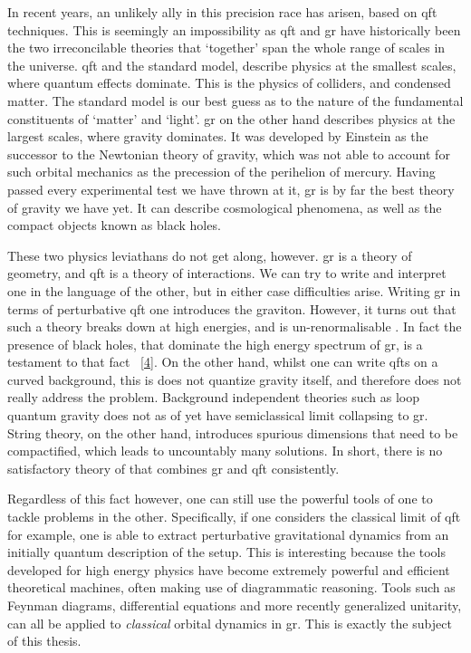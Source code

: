 \documentclass[
  10pt,
  a4paper,
  DIV=11,
  numbers=noendperiod,
  twoside]{scrreprt}
\DeclareRobustCommand{\[}{\begin{equation}}
\DeclareRobustCommand{\]}{\end{equation}}
\begin{document}
In recent years, an unlikely ally in this precision race has arisen,
based on \gls{qft} techniques. This is seemingly an impossibility as
\gls{qft} and \gls{gr} have historically been the two irreconcilable
theories that `together' span the whole range of scales in the universe.
\gls{qft} and the standard model, describe physics at the smallest
scales, where quantum effects dominate. This is the physics of
colliders, and condensed matter. The standard model is our best guess as
to the nature of the fundamental constituents of `matter' and `light'.
\gls{gr} on the other hand describes physics at the largest scales,
where gravity dominates. It was developed by Einstein as the successor
to the Newtonian theory of gravity, which was not able to account for
such orbital mechanics as the precession of the perihelion of mercury.
Having passed every experimental test we have thrown at it, \gls{gr} is
by far the best theory of gravity we have yet. It can describe
cosmological phenomena, as well as the compact objects known as black
holes.

These two physics leviathans do not get along, however. \gls{gr} is a
theory of geometry, and \gls{qft} is a theory of interactions. We can
try to write and interpret one in the language of the other, but in
either case difficulties arise. Writing \gls{gr} in terms of
perturbative \gls{qft} one introduces the graviton. However, it turns
out that such a theory breaks down at high energies, and is
un-renormalisable . In fact the presence of black holes, that dominate
the high energy spectrum of \gls{gr}, is a testament to that fact
~{[}\protect\hyperlink{ref-Shomer:2007vq}{4}{]}. On the other hand,
whilst one can write \glspl{qft} on a curved background, this is does
not quantize gravity itself, and therefore does not really address the
problem. Background independent theories such as loop quantum gravity
does not as of yet have semiclassical limit collapsing to \gls{gr}.
String theory, on the other hand, introduces spurious dimensions that
need to be compactified, which leads to uncountably many solutions. In
short, there is no satisfactory theory of that combines \gls{gr} and
\gls{qft} consistently.

Regardless of this fact however, one can still use the powerful tools of
one to tackle problems in the other. Specifically, if one considers the
classical limit of \gls{qft} for example, one is able to extract
perturbative gravitational dynamics from an initially quantum
description of the setup. This is interesting because the tools
developed for high energy physics have become extremely powerful and
efficient theoretical machines, often making use of diagrammatic
reasoning. Tools such as Feynman diagrams, differential equations and
more recently generalized unitarity, can all be applied to
\emph{classical} orbital dynamics in \gls{gr}. This is exactly the
subject of this thesis.
\end{document}
